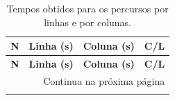 \begin{longtable}{rrrr}

\caption{Tempos obtidos para os percursos por linhas e por colunas.}
\label{tab:atvd01-resultados}
\\

\toprule
\textbf{N}
&
\textbf{Linha (s)}
&
\textbf{Coluna (s)}
&
\textbf{C/L}
\\
\midrule
\endfirsthead

\toprule
\textbf{N}
&
\textbf{Linha (s)}
&
\textbf{Coluna (s)}
&
\textbf{C/L}
\\
\midrule
\endhead

\midrule
\multicolumn{4}{r}{Continua na próxima página}
\\
\endfoot

\bottomrule
\endlastfoot


\end{longtable}

